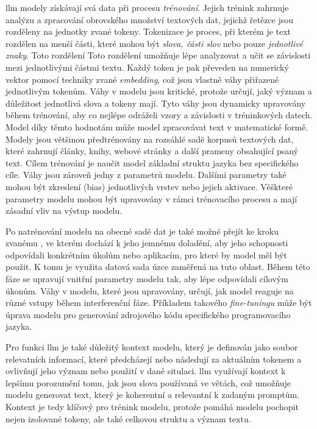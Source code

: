 \documentclass[czech, ma, kiv, he, iso690alph, pdf, viewonly]{fasthesis}
\begin{document}
    \Gls{llm} modely získávají svá data při procesu \textit{trénování}. Jejich trénink zahrnuje analýzu a zpracování obrovského množství textových dat, jejichž řetězce jsou rozděleny na jednotky zvané \gls{token}y. Tokenizace je proces, při kterém je text rozdělen na menší části, které mohou být \textit{slova, části slov} nebo pouze \textit{jednotlivé znaky}. Toto rozdělení Toto rozdělení umožňuje lépe analyzovat a učit se závislosti mezi jednotlivými částmi textu. Každý token je pak převeden na numerický vektor pomocí techniky zvané \emph{embedding}, což jsou vlastně váhy přiřazené jednotlivým tokenům. Váhy v modelu jsou kritické, protože určují, jaký význam a důležitost jednotlivá slova a tokeny mají. Tyto váhy jsou dynamicky upravovány během trénování, aby co nejlépe odráželi vzory a závislosti v tréninkových datech. Model díky těmto hodnotám může model zpracovávat text v matematické formě. Modely jsou většinou předtrénovány na rozsáhlé sadě korpusů textových dat, které zahrnují články, knihy, webové stránky a další prameny obsahující psaný text. Cílem trénování je naučit model základní struktu jazyka bez specifického cíle. Váhy jsou zároveň jedny z parametrů modelu. Dalšími parametry také mohou být zkreslení (bias) jednotlivých vrstev nebo jejich aktivace. Věškteré parametry modelu mohou být upravovány v rámci trénovacího procesu a mají zásadní vliv na výstup modelu. \cite{prazak2022embedding} \cite{prazak2022seq2seq}

    Po natrénování modelu na obecné sadě dat je také možné přejít ke kroku zvanému , ve kterém dochází k jeho jemnému doladění, aby jeho schopnosti odpovídali konkrétním úkolům nebo aplikacím, pro které by model měl být použit. K tomu je využita datová sada úzce zaměřená na tuto oblast. Během této fáze se upravují vnitřní parametry modelu tak, aby lépe odpovídali cílovým úkonům. Váhy v modelu, které jsou upravovány, určují, jak model reaguje na různé vstupy během interferenční fáze. Příkladem takového \textit{fine-tuningu} může být úprava modelu pro generování zdrojového kódu specifického programovacího jazyka.

    Pro funkci \Gls{llm} je také důležitý kontext modelu, který je definován jako soubor relevatních informací, které předcházejí nebo následují za aktuálním tokenem a ovlivňují jeho význam nebo použití v dané situlaci. \Gls{llm} využívají kontext k lepšímu porozumění tomu, jak jsou slova používaná ve větách, což umožňuje modelu generovat text, který je koherentní a relevantní k zadaným promptům. Kontext je tedy klíčový pro trénink modelu, protože pomáhá modelu pochopit nejen izolované tokeny, ale také celkovou struktu a význam textu.
\end{document}

